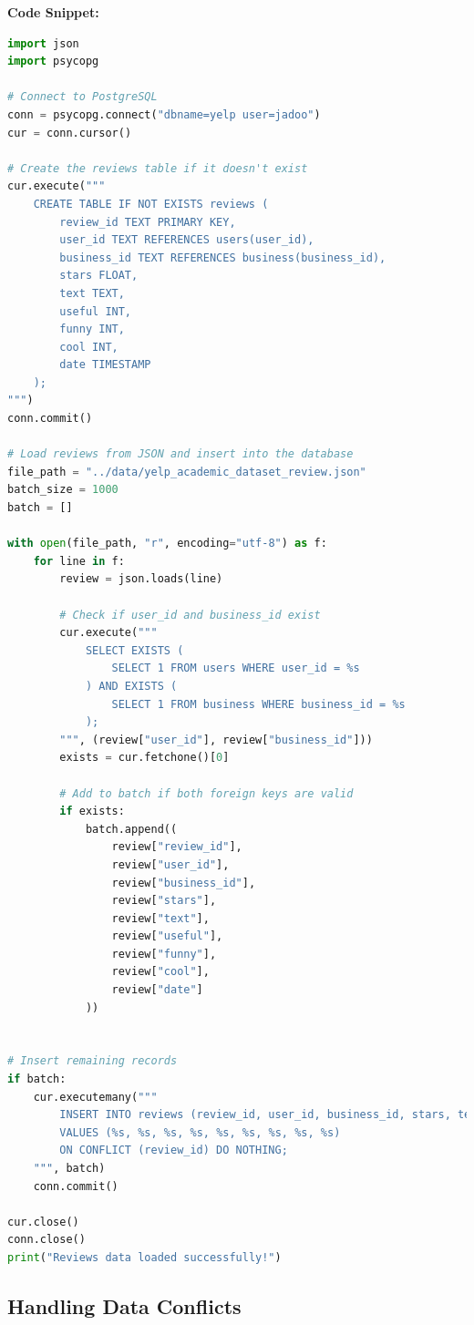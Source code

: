 \documentclass[12pt]{article}
\begin{document}
\textbf{Code Snippet:}
\begin{lstlisting}[language=Python, caption=Loading Users into PostgreSQL]
import json
import psycopg

# Connect to PostgreSQL
conn = psycopg.connect("dbname=yelp user=jadoo")
cur = conn.cursor()

# Create the reviews table if it doesn't exist
cur.execute("""
    CREATE TABLE IF NOT EXISTS reviews (
        review_id TEXT PRIMARY KEY,
        user_id TEXT REFERENCES users(user_id),
        business_id TEXT REFERENCES business(business_id),
        stars FLOAT,
        text TEXT,
        useful INT,
        funny INT,
        cool INT,
        date TIMESTAMP
    );
""")
conn.commit()

# Load reviews from JSON and insert into the database
file_path = "../data/yelp_academic_dataset_review.json"
batch_size = 1000
batch = []

with open(file_path, "r", encoding="utf-8") as f:
    for line in f:
        review = json.loads(line)

        # Check if user_id and business_id exist
        cur.execute("""
            SELECT EXISTS (
                SELECT 1 FROM users WHERE user_id = %s
            ) AND EXISTS (
                SELECT 1 FROM business WHERE business_id = %s
            );
        """, (review["user_id"], review["business_id"]))
        exists = cur.fetchone()[0]

        # Add to batch if both foreign keys are valid
        if exists:
            batch.append((
                review["review_id"],
                review["user_id"],
                review["business_id"],
                review["stars"],
                review["text"],
                review["useful"],
                review["funny"],
                review["cool"],
                review["date"]
            ))


# Insert remaining records
if batch:
    cur.executemany("""
        INSERT INTO reviews (review_id, user_id, business_id, stars, text, useful, funny, cool, date)
        VALUES (%s, %s, %s, %s, %s, %s, %s, %s, %s)
        ON CONFLICT (review_id) DO NOTHING;
    """, batch)
    conn.commit()

cur.close()
conn.close()
print("Reviews data loaded successfully!")

\end{lstlisting}

\subsection{Handling Data Conflicts}
\end{document}
